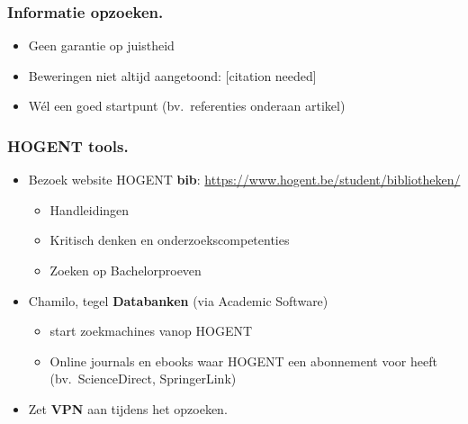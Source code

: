 \documentclass[aspectratio=169]{beamer}
\begin{document}
\begin{frame}
  \frametitle{Informatie opzoeken.}


  {\pause}

  \begin{itemize}
    \item Geen garantie op juistheid
    \item Beweringen niet altijd aangetoond: [citation needed]
    \item \alert{Wél} een goed startpunt (bv.\ referenties onderaan artikel)
  \end{itemize}
\end{frame}

\begin{frame}
  \frametitle{HOGENT tools.}

  \begin{itemize}
    \item<+-> Bezoek website HOGENT \textbf{bib}: \url{https://www.hogent.be/student/bibliotheken/}
    \begin{itemize}
      \item Handleidingen
      \item Kritisch denken en onderzoekscompetenties
      \item Zoeken op Bachelorproeven
    \end{itemize}
    \item<+-> Chamilo, tegel \textbf{Databanken} (via Academic Software)
    \begin{itemize}
      \item start zoekmachines vanop HOGENT
      \item Online journals en ebooks waar HOGENT een abonnement voor heeft (bv.~ScienceDirect, SpringerLink)
    \end{itemize}
    \item<+-> Zet \textbf{VPN} aan tijdens het opzoeken.
  \end{itemize}
\end{frame}
\end{document}
